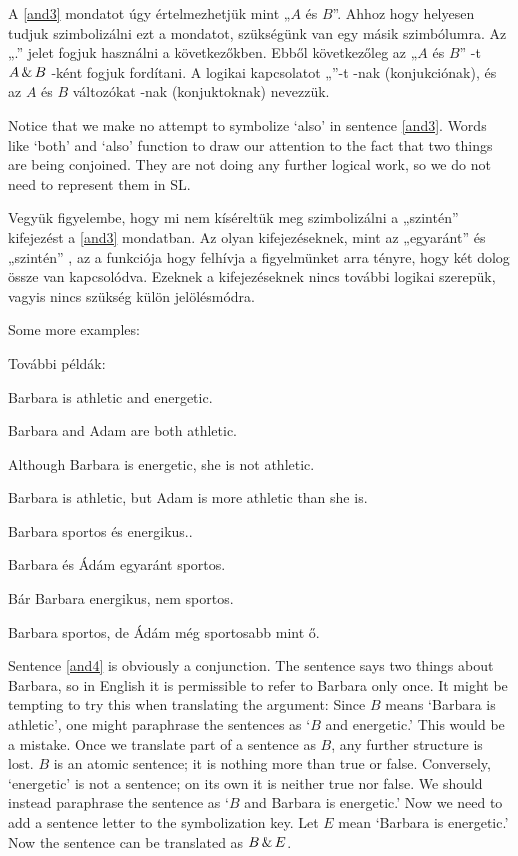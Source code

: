 A \ref{and3} mondatot úgy értelmezhetjük mint „$A$ és $B$”. 
Ahhoz hogy helyesen tudjuk szimbolizálni ezt a mondatot, szükségünk van egy másik szimbólumra. Az „\eand.” jelet fogjuk használni a következőkben. 
Ebből következőleg az „$A$ és $B$” -t  $A\,\&\, B$ -ként fogjuk fordítani. 
A logikai kapcsolatot „\eand”-t -nak (konjukciónak), és az $A$ és $B$  változókat  -nak (konjuktoknak) nevezzük.



Notice that we make no attempt to symbolize `also' in sentence \ref{and3}.
Words like `both' and `also' function to draw our attention to the fact that two things are being conjoined. They are not doing any further logical work, so we do not need to represent them in SL.

Vegyük figyelembe, hogy mi nem kíséreltük meg szimbolizálni a „szintén” kifejezést a \ref{and3} mondatban.
Az olyan kifejezéseknek, mint az „egyaránt” és „szintén” , az a funkciója hogy felhívja a figyelmünket arra tényre, hogy két dolog össze van kapcsolódva.
Ezeknek a kifejezéseknek nincs további logikai szerepük, vagyis nincs szükség külön jelölésmódra.

Some more examples:

További példák:

\begin{earg}
\item[\ex{and4}]Barbara is athletic and energetic.
\item[\ex{and5}]Barbara and Adam are both athletic.
\item[\ex{and6}]Although Barbara is energetic, she is not athletic.
\item[\ex{and7}]Barbara is athletic, but Adam is more athletic than she is.
\end{earg}

\begin{earg}
\item[\ex{and4}]Barbara sportos és energikus..
\item[\ex{and5}]Barbara és Ádám egyaránt sportos.
\item[\ex{and6}]Bár Barbara energikus, nem sportos.
\item[\ex{and7}]Barbara sportos, de Ádám még sportosabb mint ő.
\end{earg}

Sentence \ref{and4} is obviously a conjunction. 
The sentence says two things about Barbara, so in English it is permissible to refer to Barbara only once. 
It might be tempting to try this when translating the argument: Since $B$ means `Barbara is athletic', one might paraphrase the sentences as `$B$ and energetic.' 
This would be a mistake. 
Once we translate part of a sentence as $B$, any further structure is lost.
$B$ is an atomic sentence; it is nothing more than true or false. 
Conversely, `energetic' is not a sentence; on its own it is neither true nor false.
We should instead paraphrase the sentence as `$B$ and Barbara is energetic.' 
Now we need to add a sentence letter to the symbolization key. 
Let $E$ mean `Barbara is energetic.' Now the sentence can be translated as $B\,\&\, E$.

